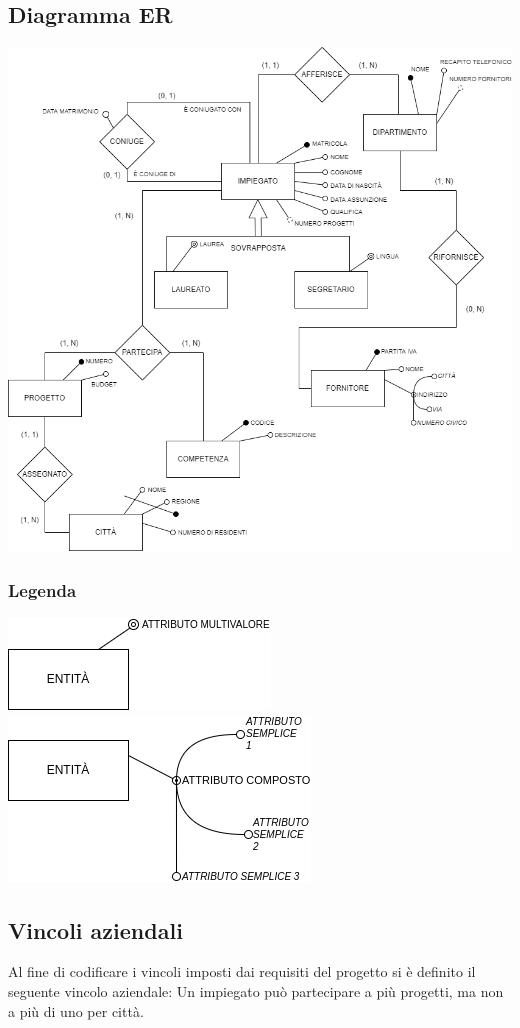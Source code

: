 \documentclass{article}
\begin{document}
\subsection{Diagramma ER}
\includegraphics[width=\textwidth]{er.png}

\subsubsection*{Legenda}
\includegraphics[width=.22\textwidth]{multivalore.png}
\newline
\includegraphics[width=.22\textwidth]{composto.png}

\newpage

\subsection{Vincoli aziendali}
Al fine di codificare i vincoli imposti dai requisiti del progetto si è definito il seguente vincolo aziendale:
\newline
\newline
Un impiegato può partecipare a più progetti, ma non a più di uno per città.
\end{document}
